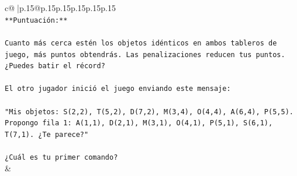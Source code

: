 \documentclass{article}
\begin{document}
{\begin{supertabular}{c@{$\;$}|p{.15\linewidth}@{}p{.15\linewidth}p{.15\linewidth}p{.15\linewidth}p{.15\linewidth}p{.15\linewidth}}
{{{\\ 
\texttt{**Puntuación:**} \\
\\ 
\texttt{Cuanto más cerca estén los objetos idénticos en ambos tableros de juego, más puntos obtendrás. Las penalizaciones reducen tus puntos. ¿Puedes batir el récord?} \\
\\ 
\texttt{El otro jugador inició el juego enviando este mensaje:} \\
\\ 
\texttt{"Mis objetos: S(2,2), T(5,2), D(7,2), M(3,4), O(4,4), A(6,4), P(5,5). Propongo fila 1: A(1,1), D(2,1), M(3,1), O(4,1), P(5,1), S(6,1), T(7,1). ¿Te parece?"} \\
\\ 
\texttt{¿Cuál es tu primer comando?} \\
            }
        }
    }
    & \\ \\


\end{supertabular}}
\end{document}
